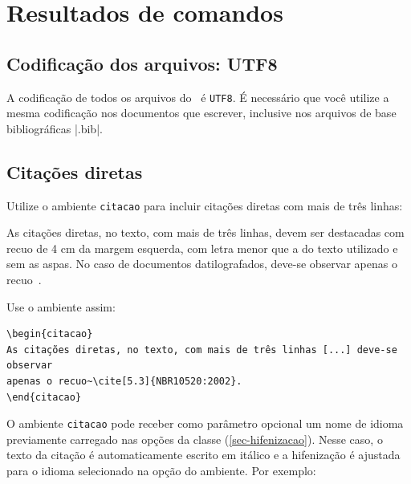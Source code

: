
\chapter{Resultados de comandos}%
\label{cap_exemplos}

%

\section{Codificação dos arquivos: UTF8}

A codificação de todos os arquivos do \abnTeX\ é \texttt{UTF8}. É necessário que
você utilize a mesma codificação nos documentos que escrever, inclusive nos
arquivos de base bibliográficas |.bib|.

\section{Citações diretas}%
\label{sec-citacao}%
Utilize o ambiente \texttt{citacao} para incluir
citações diretas com mais de três linhas:

\begin{citacao}
As citações diretas, no texto, com mais de três linhas, devem ser
destacadas com recuo de 4 cm da margem esquerda, com letra menor que a do texto
utilizado e sem as aspas. No caso de documentos datilografados, deve-se
observar apenas o recuo~\cite[5.3]{NBR10520:2002}.
\end{citacao}

Use o ambiente assim:

\begin{verbatim}
\begin{citacao}
As citações diretas, no texto, com mais de três linhas [...] deve-se observar
apenas o recuo~\cite[5.3]{NBR10520:2002}.
\end{citacao}
\end{verbatim}

O ambiente \texttt{citacao} pode receber como parâmetro opcional um nome de
idioma previamente carregado nas opções da classe (\autoref{sec-hifenizacao}). Nesse
caso, o texto da citação é automaticamente escrito em itálico e a hifenização é
ajustada para o idioma selecionado na opção do ambiente. Por exemplo:

